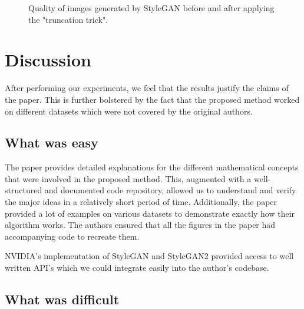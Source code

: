 \begin{figure}




\caption{Quality of images generated by StyleGAN before and after applying the "truncation trick".}
\label{fig:truncation_psi}
\end{figure}

\section{Discussion}

After performing our experiments, we feel that the results justify the claims of the paper. This is further bolstered by the fact that the proposed method worked on different datasets which were not covered by the original authors.

\subsection{What was easy}

The paper provides detailed explanations for the different mathematical concepts that were involved in the proposed method. This, augmented with a well-structured and documented code repository, allowed us to understand and verify the major ideas in a relatively short period of time. Additionally, the paper provided a lot of examples on various datasets to demonstrate exactly how their algorithm works. The authors ensured that all the figures in the paper had accompanying code to recreate them.

NVIDIA's implementation of StyleGAN and StyleGAN2 provided access to well written API's which we could integrate easily into the author's codebase.

\subsection{What was difficult}

